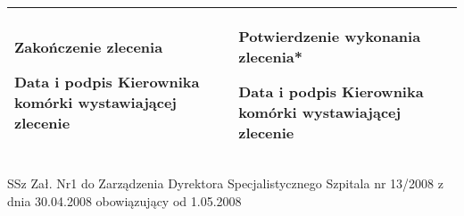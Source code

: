 \documentclass[11pt,a4paper]{article}
\begin{document}
\begin{tabularx}{\linewidth}{|X|X|}
\hline
{\footnotesize \textbf{Zakończenie zlecenia}}\newline


{\scriptsize Data i podpis Kierownika komórki wystawiającej zlecenie }
&
{\footnotesize \textbf{Potwierdzenie wykonania zlecenia*}}\newline


{\scriptsize Data i podpis Kierownika komórki wystawiającej zlecenie }
\\ \hline


\end{tabularx}
\begin{center}
{\scriptsize SSz Zał. Nr1 do Zarządzenia Dyrektora Specjalistycznego Szpitala  nr 13/2008 z dnia 30.04.2008 obowiązujący od 1.05.2008}
\end{center}
\end{document}
